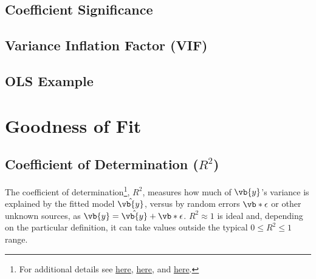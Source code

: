 \subsection{Coefficient Significance}
\label{regression:linear:coeff_significance}

\subsection{Variance Inflation Factor (VIF)}
\label{regression:linear:VIF}

\subsection{OLS Example}
\label{regression:linear:example}

\section{Goodness of Fit}
\label{regression:goodness_of_fit}

\subsection{Coefficient of Determination ($R^{2}$)}
\label{regression:goodness_of_fit:R2}

The coefficient of determination\footnote{For additional details see
\href{https://economictheoryblog.com/2014/11/05/the-coefficient-of-determination-latex-r2/}{here},
\href{https://economictheoryblog.com/2014/11/05/proof/}{here}, and
\href{http://people.duke.edu/~rnau/rsquared.htm}{here}.}, $R^{2}$,
measures how much of $\vb{y}$'s variance is explained by the fitted model $\hat{\vb{y}}$,
versus by random errors $\vb*{\epsilon}$ or other unknown sources,
as $\vb{y} = \hat{\vb{y}} + \vb*{\epsilon}$.
$R^{2} \approx 1$ is ideal and, depending on the particular definition,
it can take values outside the typical $0 \leq R^{2} \leq 1$ range.

